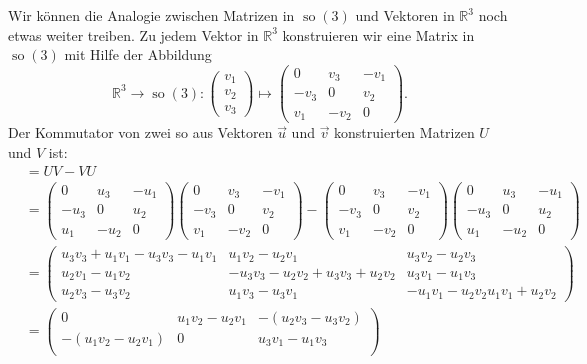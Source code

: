 \begin{beispiel}
Wir können die Analogie zwischen Matrizen in $\operatorname{so}(3)$ und
Vektoren in $\mathbb R^3$ noch etwas weiter treiben. Zu jedem Vektor
in $\mathbb R^3$ konstruieren wir eine Matrix in $\operatorname{so}(3)$
mit Hilfe der Abbildung
\[
\mathbb R^3\to\operatorname{so}(3)
:
\begin{pmatrix}v_1\\v_2\\v_3\end{pmatrix}
\mapsto
\begin{pmatrix}
  0 & v_3&-v_1\\
-v_3&  0 & v_2\\
 v_1&-v_2&  0
\end{pmatrix}.
\]
Der Kommutator von zwei so aus Vektoren $\vec u$ und $\vec v$
konstruierten Matrizen $U$ und $V$ ist:
\begin{align*}
[U,V]
&=
UV-VU
\\
&=
\begin{pmatrix}
  0 & u_3&-u_1\\
-u_3&  0 & u_2\\
 u_1&-u_2&  0
\end{pmatrix}
\begin{pmatrix}
  0 & v_3&-v_1\\
-v_3&  0 & v_2\\
 v_1&-v_2&  0
\end{pmatrix}
-
\begin{pmatrix}
  0 & v_3&-v_1\\
-v_3&  0 & v_2\\
 v_1&-v_2&  0
\end{pmatrix}
\begin{pmatrix}
  0 & u_3&-u_1\\
-u_3&  0 & u_2\\
 u_1&-u_2&  0
\end{pmatrix}
\\
&=
\begin{pmatrix}
u_3v_3+u_1v_1 - u_3v_3 - u_1v_1
	& u_1v_2 - u_2v_1
		& u_3v_2 - u_2v_3 
\\
u_2v_1 - u_1v_2
	& -u_3v_3-u_2v_2 + u_3v_3+u_2v_2
		& u_3v_1 - u_1v_3
\\
u_2v_3 - u_3v_2         
	& u_1v_3 - u_3v_1
		&-u_1v_1-u_2v_2 u_1v_1+u_2v_2
\end{pmatrix}
\\
&=
\begin{pmatrix}
0
	& u_1v_2 - u_2v_1
		&-(u_2v_3-u_3v_2)
\\
-( u_1v_2 - u_2v_1)
	& 0
		& u_3v_1 - u_1v_3
\\

\end{pmatrix}
\end{align*}
\end{beispiel}
